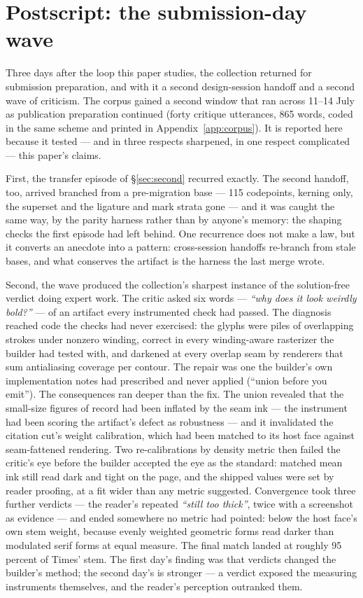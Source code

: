 \documentclass[11pt]{article}
\begin{document}
\section{Postscript: the submission-day wave}\label{sec:day2}

Three days after the loop this paper studies, the collection returned for submission preparation, and with it a second design-session handoff and a second wave of criticism. The corpus gained a second window that ran across 11--14 July as publication preparation continued (forty critique utterances, 865 words, coded in the same scheme and printed in Appendix~\ref{app:corpus}). It is reported here because it tested — and in three respects sharpened, in one respect complicated — this paper's claims.

First, the transfer episode of \S\ref{sec:second} recurred exactly. The second handoff, too, arrived branched from a pre-migration base — 115 codepoints, kerning only, the superset and the ligature and mark strata gone — and it was caught the same way, by the parity harness rather than by anyone's memory: the shaping checks the first episode had left behind. One recurrence does not make a law, but it converts an anecdote into a pattern: cross-session handoffs re-branch from stale bases, and what conserves the artifact is the harness the last merge wrote.

Second, the wave produced the collection's sharpest instance of the solution-free verdict doing expert work. The critic asked six words — \emph{``why does it look weirdly bold?''} — of an artifact every instrumented check had passed. The diagnosis reached code the checks had never exercised: the glyphs were piles of overlapping strokes under nonzero winding, correct in every winding-aware rasterizer the builder had tested with, and darkened at every overlap seam by renderers that sum antialiasing coverage per contour. The repair was one the builder's own implementation notes had prescribed and never applied (``union before you emit''). The consequences ran deeper than the fix. The union revealed that the small-size figures of record had been inflated by the seam ink — the instrument had been scoring the artifact's defect as robustness — and it invalidated the citation cut's weight calibration, which had been matched to its host face against seam-fattened rendering. Two re-calibrations by density metric then failed the critic's eye before the builder accepted the eye as the standard: matched mean ink still read dark and tight on the page, and the shipped values were set by reader proofing, at a fit wider than any metric suggested. Convergence took three further verdicts — the reader's repeated \emph{``still too thick''}, twice with a screenshot as evidence — and ended somewhere no metric had pointed: below the host face's own stem weight, because evenly weighted geometric forms read darker than modulated serif forms at equal measure. The final match landed at roughly 95 percent of Times' stem. The first day's finding was that verdicts changed the builder's method; the second day's is stronger — a verdict exposed the measuring instruments themselves, and the reader's perception outranked them.
\end{document}
